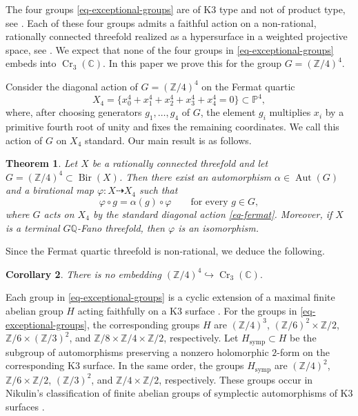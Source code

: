 \documentclass[10pt,oneside,reqno]{amsart}
\numberwithin{equation}{section}
\newtheorem{theorem}{Theorem}[section]
\newtheorem{corollary}[theorem]{Corollary}
\theoremstyle{definition}
\newcommand{\Z}{\mathbb Z}
\newcommand{\Q}{\mathbb Q}
\newcommand{\C}{\mathbb C}
\newcommand{\PP}{\mathbb P}
\newcommand{\Cr}{\operatorname{Cr}}
\begin{document}
The four groups \eqref{eq-exceptional-groups} are of K3 type and not of product type, see
\cite[Table 1]{LoginovProduct}.  
Each of these four groups admits a faithful action on a non-rational,
rationally connected
threefold realized as a hypersurface in a weighted projective space,
see \cite[Example~1.8(1)--(4)]{LPZ}.
We expect
that none of the four groups in \eqref{eq-exceptional-groups} embeds
into $\Cr_3(\C)$. In this paper we prove this for the group $G=(\mathbb{Z}/4)^4$.  

Consider the diagonal action of $G=(\mathbb{Z}/4)^4$ on the Fermat quartic
\begin{equation}
\label{eq-fermat}
X_4=\{x_0^4+x_1^4+x_2^4+x_3^4+x_4^4=0\}\subset\PP^4,
\end{equation}
where, after choosing generators $g_1,\ldots,g_4$ of $G$, the element
$g_i$ multiplies $x_i$ by a primitive fourth root of unity and fixes
the remaining coordinates. We call this action of $G$ on $X_4$ {standard}. 
Our main result is as follows. 

\begin{theorem}
\label{thm-classification}
Let $X$ be a rationally connected threefold and let
$G=(\Z/4)^4\subset\operatorname{Bir}(X)$.  Then there exist an
automorphism $\alpha\in\operatorname{Aut}(G)$ and a birational map
$\varphi\colon X\dashrightarrow X_4$ such that
\[
 \varphi\circ g=\alpha(g)\circ\varphi
 \qquad\text{for every }g\in G,
\]
where $G$ acts on $X_4$ by the standard diagonal action
\eqref{eq-fermat}.
Moreover, if $X$ is a terminal $G\Q$-Fano threefold, then $\varphi$ is an isomorphism.
\end{theorem}

Since the Fermat quartic threefold is non-rational, we deduce the
following.

\begin{corollary}
\label{cor-cremona}
There is no embedding
$
 (\Z/4)^4\hookrightarrow\Cr_3(\C).
$
\end{corollary}


Each group in \eqref{eq-exceptional-groups} is a cyclic extension of a
maximal finite abelian group $H$ acting faithfully on a K3 surface
\cite{BH}.  For the groups  in
\eqref{eq-exceptional-groups}, the corresponding groups $H$ are
$(\Z/4)^3$, $(\Z/6)^2\times\Z/2$, $\Z/6\times(\Z/3)^2$, and
$\Z/8\times\Z/4\times\Z/2$, respectively.  Let
$H_{\mathrm{symp}}\subset H$ be the subgroup of automorphisms preserving
a nonzero holomorphic $2$-form on the corresponding K3 surface.  In the
same order, the groups $H_{\mathrm{symp}}$ are $(\Z/4)^2$,
$\Z/6\times\Z/2$, $(\Z/3)^2$, and $\Z/4\times\Z/2$, respectively.
These groups occur in Nikulin's classification of finite
abelian groups of symplectic automorphisms of K3 surfaces
\cite{NikulinK3}.
\end{document}
